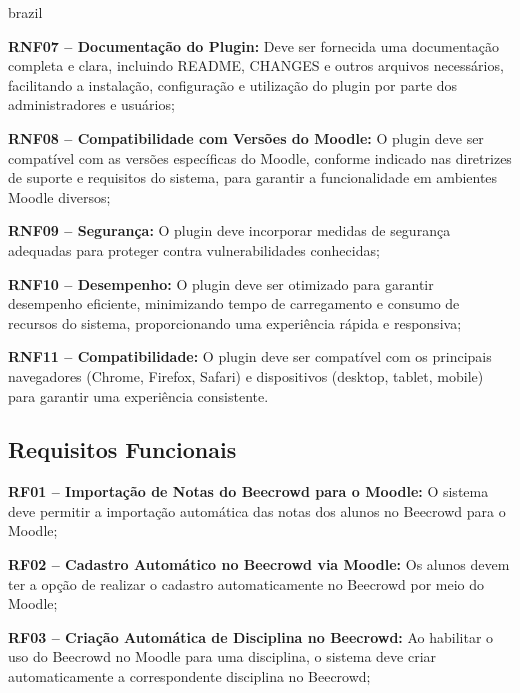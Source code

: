 \begin{otherlanguage*}{brazil}
\vspace{12pt}

\textbf{RNF07 – Documentação do Plugin:} Deve ser fornecida uma documentação completa e clara, incluindo README, CHANGES e outros arquivos necessários, facilitando a instalação, configuração e utilização do plugin por parte dos administradores e usuários;

\vspace{12pt}

\textbf{RNF08 – Compatibilidade com Versões do Moodle:} O plugin deve ser compatível com as versões específicas do Moodle, conforme indicado nas diretrizes de suporte e requisitos do sistema, para garantir a funcionalidade em ambientes Moodle diversos;

\vspace{12pt}

\textbf{RNF09 – Segurança:} O plugin deve incorporar medidas de segurança adequadas para proteger contra vulnerabilidades conhecidas;

\vspace{12pt}

\textbf{RNF10 – Desempenho:} O plugin deve ser otimizado para garantir desempenho eficiente, minimizando tempo de carregamento e consumo de recursos do sistema, proporcionando uma experiência rápida e responsiva;

\vspace{12pt}

\textbf{RNF11 – Compatibilidade:} O plugin deve ser compatível com os principais navegadores (Chrome, Firefox, Safari) e dispositivos (desktop, tablet, mobile) para garantir uma experiência consistente.

\subsection{Requisitos Funcionais}

\textbf{RF01 – Importação de Notas do Beecrowd para o Moodle:} O sistema deve permitir a importação automática das notas dos alunos no Beecrowd para o Moodle;

\vspace{12pt}

\textbf{RF02 – Cadastro Automático no Beecrowd via Moodle:} Os alunos devem ter a opção de realizar o cadastro automaticamente no Beecrowd por meio do Moodle;

\vspace{12pt}

\textbf{RF03 – Criação Automática de Disciplina no Beecrowd:} Ao habilitar o uso do Beecrowd no Moodle para uma disciplina, o sistema deve criar automaticamente a correspondente disciplina no Beecrowd;


\end{otherlanguage*}

